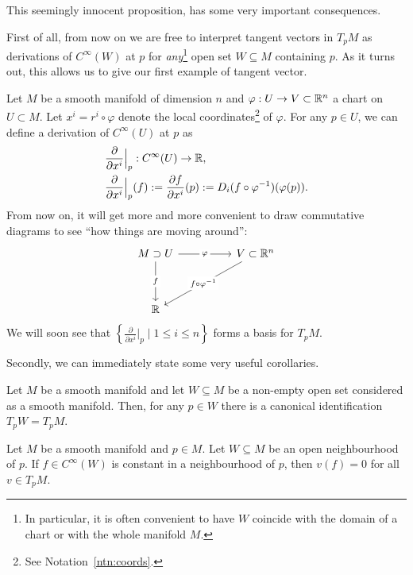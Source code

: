 This seemingly innocent proposition, has some very important consequences.

First of all, from now on we are free to interpret tangent vectors in $T_p M$ as derivations of $C^\infty(W)$ at $p$ for \emph{any}\footnote{In particular, it is often convenient to have $W$ coincide with the domain of a chart or with the whole manifold $M$.} open set $W\subseteq M$ containing $p$.
As it turns out, this allows us to give our first example of tangent vector.

\begin{example}\label{ex:partialderivative}
  Let $M$ be a smooth manifold of dimension $n$ and $\varphi: U \to V\subset\mathbb{R}^n$ a chart on $U\subset M$.
  Let $x^i = r^i \circ \varphi$ denote the local coordinates\footnote{See Notation~\ref{ntn:coords}.} of $\varphi$.
  For any $p\in U$, we can define a derivation of $C^\infty(U)$ at $p$ as
  \begin{align}
     & \frac{\partial}{\partial x^i}\Big|_p : C^\infty(U) \to \mathbb{R},                                                             \\
     & \frac{\partial}{\partial x^i}\Big|_p (f) := \frac{\partial f}{\partial x^i}(p) := D_i(f\circ\varphi^{-1})(\varphi(p)).
  \end{align}
  From now on, it will get more and more convenient to draw commutative diagrams to see ``how things are moving around'':
  \begin{equation}
    \begin{tikzcd}[column sep = huge, row sep = huge]
      M\supset U \arrow[r, "\varphi" description] \arrow[d, "f" description] & V \subset\R^n \arrow [dl, "f\circ\varphi^{-1}" description]\\
      \R &
    \end{tikzcd}
  \end{equation}
  We will soon see that $\left\{\frac{\partial}{\partial x^i}\Big|_p \mid 1\leq i\leq n\right\}$ forms a basis for $T_p M$.
\end{example}

Secondly, we can immediately state some very useful corollaries.

\begin{corollary}\label{cor:tgsubspace}
  Let $M$ be a smooth manifold and let $W\subseteq M$ be a non-empty open set considered as a smooth manifold.
  Then, for any $p\in W$ there is a canonical identification $T_p W = T_p M$.
\end{corollary}

\begin{corollary}\label{cor:derzero}
  Let $M$ be a smooth manifold and $p\in M$.
  Let $W\subseteq M$ be an open neighbourhood of $p$.
  If $f\in C^\infty(W)$ is constant in a neighbourhood of $p$, then $v(f) = 0$ for all $v\in T_p M$.
\end{corollary}

